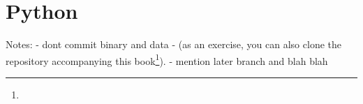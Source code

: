 \section{Python}

Notes:
- dont commit binary and data
- (as an exercise, you can also clone the repository accompanying this book\footnote{}).
- mention later branch and blah blah